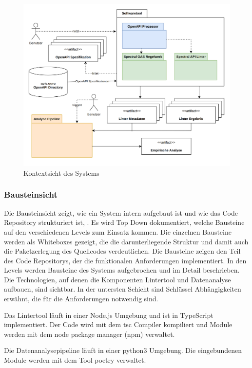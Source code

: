 \begin{figure}[htbp]
  \centering
  \includegraphics[width=1\linewidth]{img/contextview.png}
  \caption{Kontextsicht des Systems}
  \label{fig:Kontextsicht}
\end{figure}

\newpage
\subsubsection{Bausteinsicht} \label{sec:bausteinsicht}
Die Bausteinsicht zeigt, wie ein System intern aufgebaut ist und wie das Code Repository strukturiert ist, \parencite{starke_effektive_2024}. Es wird Top Down dokumentiert, welche Bausteine auf den verschiedenen Levels zum Einsatz kommen. Die einzelnen Bausteine werden als Whiteboxes gezeigt, die die darunterliegende Struktur und damit auch die Paketzerlegung des Quellcodes verdeutlichen. Die Bausteine zeigen den Teil des Code Repositorys, der die funktionalen Anforderungen implementiert. In den Levels werden Bausteine des Systems aufgebrochen und im Detail beschrieben. Die Technologien, auf denen die Komponenten Lintertool und Datenanalyse aufbauen, sind sichtbar. In der untersten Schicht sind Schlüssel Abhängigkeiten erwähnt, die für die Anforderungen notwendig sind.

Das Lintertool läuft in einer Node.js Umgebung und ist in TypeScript implementiert. Der Code wird mit dem tsc Compiler kompiliert und Module werden mit dem node package manager (npm) verwaltet. 

Die Datenanalysepipeline läuft in einer python3 Umgebung. Die eingebundenen Module werden mit dem Tool poetry verwaltet.

